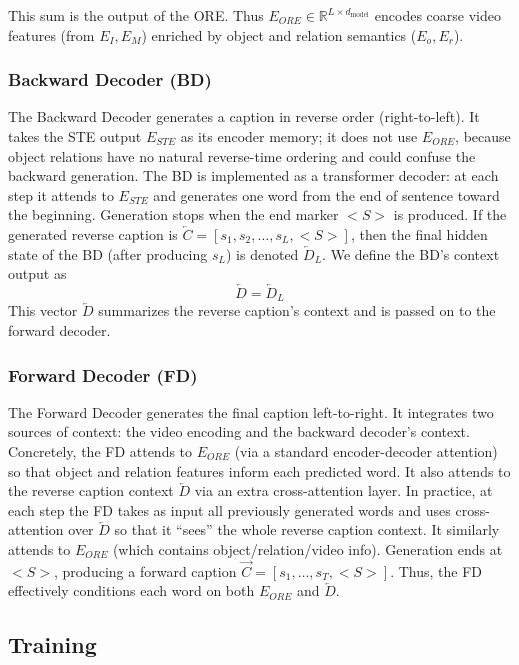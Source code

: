 This sum is the output of the ORE. Thus $E_{ORE}\in\mathbb{R}^{L\times d_{\text{model}}}$ encodes coarse video features (from $E_I,E_M$) enriched by object and relation semantics ($E_o,E_r$).

\subsubsection{Backward Decoder (BD)}

The Backward Decoder generates a caption in reverse order (right-to-left). It takes the STE output $E_{STE}$ as its encoder memory; it does not use $E_{ORE}$, because object relations have no natural reverse-time ordering and could confuse the backward generation. The BD is implemented as a transformer decoder: at each step it attends to $E_{STE}$ and generates one word from the end of sentence toward the beginning. Generation stops when the end marker $<S>$ is produced. If the generated reverse caption is $\overleftarrow{C} = [s_1, s_2, \dots, s_L, <S>]$, then the final hidden state of the BD (after producing $s_L$) is denoted $\overleftarrow{D}_L$. We define the BD's context output as
$$
\overleftarrow{D} = \overleftarrow{D}_L
$$
This vector $\overleftarrow{D}$ summarizes the reverse caption's context and is passed on to the forward decoder.

\subsubsection{Forward Decoder (FD)}

The Forward Decoder generates the final caption left-to-right. It integrates two sources of context: the video encoding and the backward decoder's context. Concretely, the FD attends to $E_{ORE}$ (via a standard encoder-decoder attention) so that object and relation features inform each predicted word. It also attends to the reverse caption context $\overleftarrow{D}$ via an extra cross-attention layer. In practice, at each step the FD takes as input all previously generated words and uses cross-attention over $\overleftarrow{D}$ so that it ``sees'' the whole reverse caption context. It similarly attends to $E_{ORE}$ (which contains object/relation/video info). Generation ends at $<S>$, producing a forward caption $\overrightarrow{C}=[s_1,\dots,s_T,<S>]$. Thus, the FD effectively conditions each word on both $E_{ORE}$ and $\overleftarrow{D}$.



\subsection{Training}

